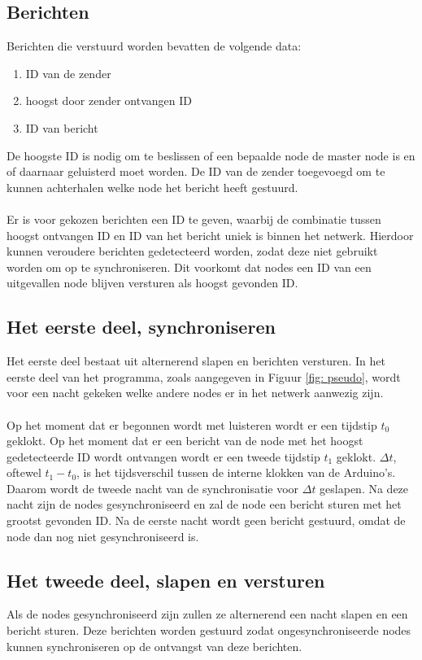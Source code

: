 \documentclass{article}
\begin{document}
\subsection{Berichten}
Berichten die verstuurd worden bevatten de volgende data:
\begin{enumerate}
\item ID van de zender
\item hoogst door zender ontvangen ID
\item ID van bericht
\end{enumerate}
De hoogste ID is nodig om te beslissen of een bepaalde node de master node is en of daarnaar geluisterd moet worden. 
De ID van de zender toegevoegd om te kunnen achterhalen welke node het bericht heeft gestuurd. \\
\\
Er is voor gekozen berichten een ID te geven, waarbij de combinatie tussen hoogst ontvangen ID en ID van het bericht uniek is binnen het netwerk. Hierdoor kunnen veroudere berichten gedetecteerd worden, zodat deze niet gebruikt worden om op te synchroniseren. Dit voorkomt dat nodes een ID van een uitgevallen node blijven versturen als hoogst gevonden ID.

\subsection{Het eerste deel, synchroniseren}
Het eerste deel bestaat uit alternerend slapen en berichten versturen. In het eerste deel van het programma, zoals aangegeven in Figuur \ref{fig: pseudo}, wordt voor een nacht gekeken welke andere nodes er in het netwerk aanwezig zijn. \\
\\
Op het moment dat er begonnen wordt met luisteren wordt er een tijdstip $t_0$ geklokt. Op het moment dat er een bericht van de node met het hoogst gedetecteerde ID wordt ontvangen wordt er een tweede tijdstip $t_1$ geklokt. $\Delta t$, oftewel $t_1 - t_0$, is het tijdsverschil tussen de interne klokken van de Arduino's. Daarom wordt de tweede nacht van de synchronisatie voor $\Delta t$ geslapen. Na deze nacht zijn de nodes gesynchroniseerd en zal de node een bericht sturen met het grootst gevonden ID. Na de eerste nacht wordt geen bericht gestuurd, omdat de node dan nog niet gesynchroniseerd is.

\subsection{Het tweede deel, slapen en versturen}
Als de nodes gesynchroniseerd zijn zullen ze alternerend een nacht slapen en een bericht sturen. Deze berichten worden gestuurd zodat ongesynchroniseerde nodes kunnen synchroniseren op de ontvangst van deze berichten.
\end{document}
